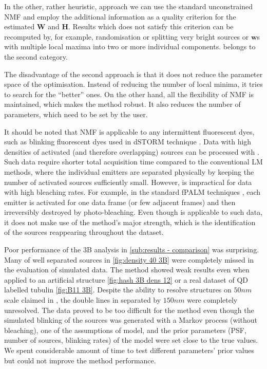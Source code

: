 In the other, rather heuristic, approach we can use the standard unconstrained NMF and employ the additional information as a quality criterion for the estimated $\bm{W}$ and $\bm{H}$. Results which does not satisfy this criterion can be recomputed by, for example, randomisation or splitting very bright sources or $\bm{w}$s with multiple local maxima into two or more individual components. \inmf{} belongs to the second category.

The disadvantage of the second approach is that it does not reduce the parameter space of the optimisation. Instead of reducing the number of local minima, it tries to search for the ``better'' ones. On the other hand, all the flexibility of NMF is maintained, which makes the method robust. It also reduces the number of parameters, which need to be set by the user.

It should be noted that NMF is applicable to any intermittent fluorescent dyes, such as blinking fluorescent dyes used in dSTORM technique \cite{VandeLinde2011}. Data with high densities of activated (and therefore overlapping) sources can be processed with \inmf{}. Such data require shorter total acquisition time compared to the conventional LM methods, where the individual emitters are separated physically by keeping the number of activated sources sufficiently small. However, \inmf{} is impractical for data with high bleaching rates. For example, in the standard fPALM techniques \cite{Hess2006}, each emitter is activated for one data frame (or few adjacent frames) and then irreversibly destroyed by photo-bleaching.  Even though \inmf{} is applicable to such data, it does not make use of the method's major strength, which is the identification of the sources reappearing throughout the dataset.  
 
Poor performance of the 3B analysis in \autoref{sub:results - comparison} was surprising. Many of well separated sources in \autoref{fig:density 40 3B} were completely missed in the evaluation of simulated data. The method showed weak results even when applied to an artificial structure \autoref{fig:hash 3B  dens 12} or a real dataset of QD labelled tubulin \autoref{fig:B11 3B}. Despite the ability to resolve structures on $50 \unit{nm}$ scale claimed in \cite{Cox2011}, the double lines in  separated by $150 \unit{nm}$ were completely unresolved. The data proved to be too difficult for the method even though the simulated blinking of the sources was generated with a Markov process (without bleaching), one of the assumptions of model, and the prior parameters (PSF, number of sources, blinking rates) of the model were set close to the true values. We spent considerable amount of time to test different parameters' prior values but could not improve the method performance. 

